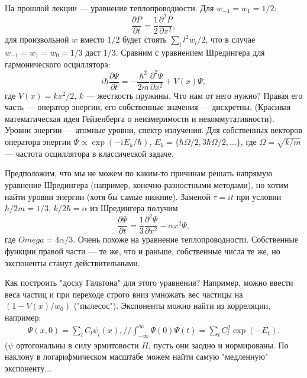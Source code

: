 \documentclass{book}
\begin{document}
На прошлой лекции --- уравнение теплопроводности. Для $w_{-1} = w_1 = 1/2$:
\begin{equation}
    \frac{\partial P}{\partial t} = \frac{1}{2} \frac{\partial^2 P}{\partial x^2},
\end{equation}
для произвольной $w$ вместо $1/2$ будет стоять $\sum_l l^2 w_l / 2$, что в случае $w_{-1} = w_1 =
w_0 = 1/3$ даст $1/3$. Сравним с уравнением Шредингера для гармонического осциллятора:
\begin{equation}
    i \hbar \frac{\partial \Psi}{\partial t} = - \frac{\hbar^2}{2 m} \frac{\partial^2 \Psi}{\partial x^2} + V(x) \Psi,
\end{equation}
где $V(x) = k x^2 / 2$, $k$ --- жесткость пружины.
Что нам от него нужно? Правая его часть --- оператор энергии, его собственные значения ---
дискретны. (Красивая математическая идея Гейзенберга о неизмеримости и некоммутативности). Уровни
энергии --- атомные уровни, спектр излучения. Для собственных векторов оператора энергии $\Psi
\propto \exp(-i E_k / \hbar)$, $E_k = \{\hbar \Omega / 2, 3 \hbar \Omega / 2, ...\}$, где $\Omega =
\sqrt{k / m}$ --- частота осциллятора в классической задаче.

Предположим, что мы не можем по каким-то причинам решать напрямую уравнение Шредингера (например,
конечно-разностными методами), но хотим найти уровни энергии (хотя бы самые нижние). Заменой $\tau
= i t$ при условии $\hbar / 2 m = 1 / 3$, $k / 2 \hbar = \alpha$ из Шредингера получим
\begin{equation}
    \frac{\partial \Psi}{\partial t} = \frac{1}{3} \frac{\partial^2 \Psi}{\partial x^2} - \alpha
    x^2 \Psi,
\end{equation}
где $Omega = 4 \alpha / 3$.
Очень похоже на уравнение теплопроводности.
Собственные функции правой части --- те же, что и раньше, собственные числа те же, но экспоненты
станут действительными.

Как построить "доску Гальтона" для этого уравнения? Например, можно ввести веса частиц и при
переходе строго вниз умножать вес частицы на $(1 - V(x) / w_0)$ ("пылесос"). Экспоненты можно найти
из корреляции, например:
\begin{eqnarray}
    \Psi(x, 0) = \sum_l C_l \psi_l(x), //
    \int_{-\infty}^\infty \Psi(0) \Psi(t) = \sum_l C_l^2 \exp(-E_t).
\end{eqnarray}
($\psi$ ортогональны в силу эрмитовости $\bar H$, пусть они заодно и нормированы. По наклону в
логарифмическом масштабе можем найти самую "медленную" экспоненту...
\end{document}
